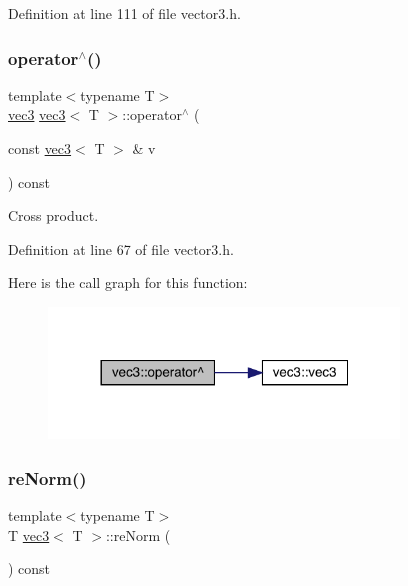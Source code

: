 Definition at line 111 of file vector3.\+h.

\mbox{\label{structvec3_a6469fdfd7c378f5f30e299bc2e1e776a}} 
\subsubsection{\texorpdfstring{operator$^\wedge$()}{operator^()}}
{\footnotesize\ttfamily template$<$typename T$>$ \\
\mbox{\hyperlink{structvec3}{vec3}} \mbox{\hyperlink{structvec3}{vec3}}$<$ T $>$\+::operator$^\wedge$ (\begin{DoxyParamCaption}\item[{const \mbox{\hyperlink{structvec3}{vec3}}$<$ T $>$ \&}]{v }\end{DoxyParamCaption}) const\hspace{0.3cm}{\ttfamily [inline]}}



Cross product. 



Definition at line 67 of file vector3.\+h.

Here is the call graph for this function\+:\nopagebreak
\begin{figure}[H]
\begin{center}
\leavevmode
\includegraphics[width=264pt]{structvec3_a6469fdfd7c378f5f30e299bc2e1e776a_cgraph}
\end{center}
\end{figure}
\mbox{\label{structvec3_a8539e3e4fbf555f6bd464fdc75fdfd56}} 
\subsubsection{\texorpdfstring{re\+Norm()}{reNorm()}}
{\footnotesize\ttfamily template$<$typename T$>$ \\
T \mbox{\hyperlink{structvec3}{vec3}}$<$ T $>$\+::re\+Norm (\begin{DoxyParamCaption}{ }\end{DoxyParamCaption}) const\hspace{0.3cm}{\ttfamily [inline]}}




